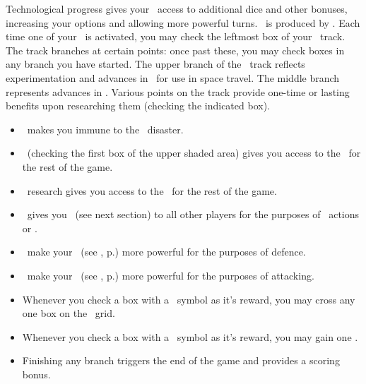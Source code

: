 Technological progress gives your \planet\ access to additional dice and other bonuses, increasing your options and allowing more powerful turns.  \tech\ is produced by \labs.  Each time one of your \labs\ is activated, you may check the leftmost box of your \tech\ track.
The track branches at certain points: once past these, you may check boxes in any branch you have started.  The upper branch of the \antimatter\ track reflects experimentation and advances in \antimatter\ for use in space travel.  The middle branch represents advances in \engineering.
\newline\newline
Various points on the track provide one-time or lasting benefits upon researching them (checking the indicated box).
\begin{itemize}
  \item \cure\ makes you immune to the \pandemic\ disaster.
  \item \antimatter\ (checking the first box of the upper shaded area) gives you access to the \bluedie\ for the rest of the game.
  \item \engineering\ research gives you access to the \blackdie\ for the rest of the game.
  \item \warpdrive\ gives you \reach\ (see next section) to all other players for the purposes of \military\ actions or \trade.
  \item \shields\ make your \squadrons\ (see , p.\pageref{sec:military}) more powerful for the purposes of defence.
  \item \lasers\ make your \squadrons\ (see , p.\pageref{sec:military}) more powerful for the purposes of attacking.
  \item Whenever you check a box with a \gainculture\ symbol as it's reward, you may cross any one box on the \culture\ grid.
  \item Whenever you check a box with a \gaincurrency\ symbol as it's reward, you may gain one \currency.
  \item Finishing any branch triggers the end of the game and provides a scoring bonus.
\end{itemize}
